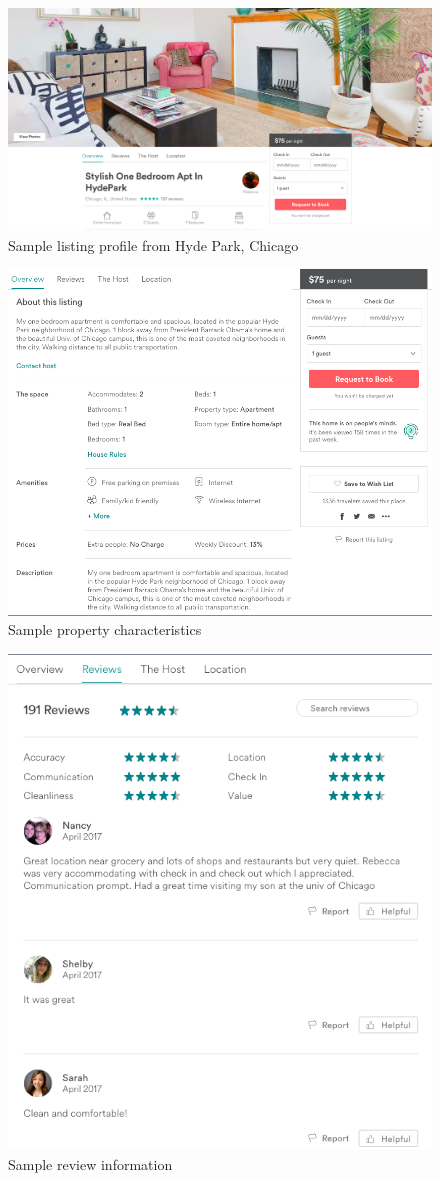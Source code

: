 \begin{figure}[h]
\includegraphics[width=.9\textwidth]{figures/sample1-cover}
\caption{Sample listing profile from Hyde Park, Chicago}
\end{figure}
\begin{figure}
\includegraphics[width=.9\textwidth]{figures/sample2-property}
\caption{Sample property characteristics}
\end{figure}
\begin{figure}
\includegraphics[width=.8\textwidth]{figures/sample3-reviews}
\caption{Sample review information}
\end{figure}
